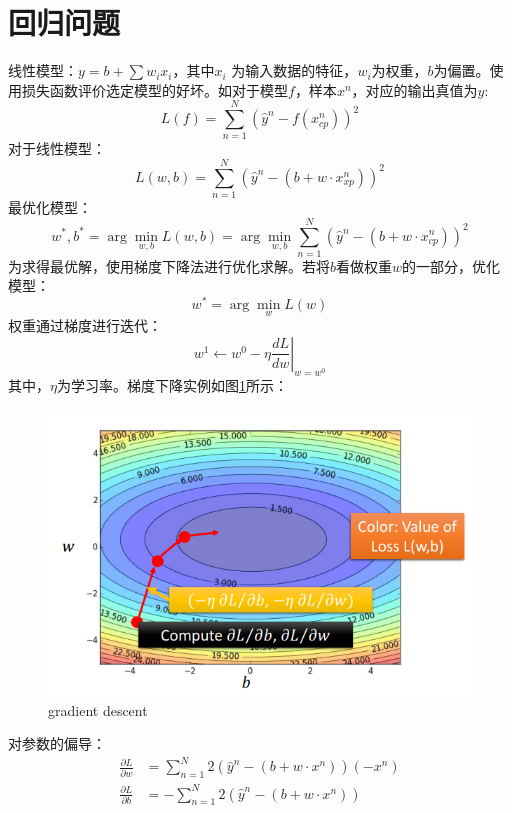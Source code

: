 \section{回归问题}
线性模型：$y=b+\sum w_i x_i$，其中$x_i$ 为输入数据的特征，$w_i$为权重，$b$为偏置。使用损失函数评价选定模型的好坏。如对于模型$f$，样本$x^n$，对应的输出真值为$\hat{y}$:
\[
	L(f)=\sum_{n=1}^{N}\left( \hat{y}^n - f(x_{cp}^n) \right)^2
\]
对于线性模型：
\[
	L(w,b)=\sum_{n=1}^{N}\left( \hat{y}^n - (b+w \cdot x_{xp}^n) \right)^2
\]
最优化模型：
\[
	w ^ { * } , b ^ { * } = \arg \min _ { w , b } L ( w , b )= \arg \min _ { w , b } \sum _ { n = 1 } ^ { N } \left( \hat { y } ^ { n } - ( b + w \cdot x _ { c p } ^ { n } ) \right) ^ { 2 }
\]
为求得最优解，使用梯度下降法进行优化求解。若将$b$看做权重$w$的一部分，优化模型：
\[
	w^* = \arg \min_w L(w)
\]
权重通过梯度进行迭代：
\[
w ^1 \leftarrow w ^0 - \eta \left. \frac { d L } { d w } \right| _ {w = w^0}
\]
其中，$\eta$为学习率。梯度下降实例如图\ref{fig:gradientdescent}所示：
\begin{figure}[hb]
	\centering
	\includegraphics[scale=0.8]{pic/gradient_descent.png}
	\caption{gradient descent}
	\label{fig:gradientdescent}
\end{figure}
对参数的偏导：
\begin{align*}
	\frac{ \partial L}{\partial w} &= \sum_{n=1}^{N} 2 \left( \hat{y}^n - (b+w \cdot x^n)  \right) (-x^n) \\
	\frac{ \partial L}{\partial b} &= -\sum_{n=1}^{N} 2 \left( \hat{y}^n - (b+w \cdot x^n)  \right)
\end{align*}

